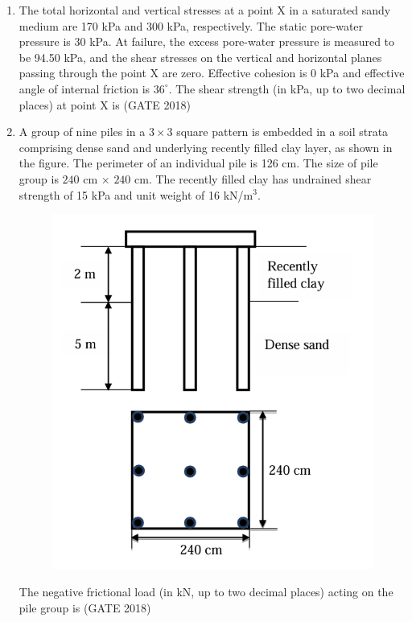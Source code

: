 \documentclass[journal,12pt,onecolumn]{IEEEtran}
\theoremstyle{remark}
\begin{document}
\begin{enumerate}
\item The total horizontal and vertical stresses at a point X in a saturated sandy medium are 170 kPa and 300 kPa, respectively. The static pore-water pressure is 30 kPa. At failure, the excess pore-water pressure is measured to be 94.50 kPa, and the shear stresses on the vertical and horizontal planes passing through the point X are zero. Effective cohesion is 0 kPa and effective angle of internal friction is $36^\circ$. The shear strength (in kPa, up to two decimal places) at point X is \underline{\hspace{3cm}}
\hfill{(GATE 2018)}
\vspace{1cm}
\newpage
\item A group of nine piles in a $3\times 3$ square pattern is embedded in a soil strata comprising dense sand and underlying recently filled clay layer, as shown in the figure. The perimeter of an individual pile is 126 cm. The size of pile group is $240$ cm $\times$ $240$ cm. The recently filled clay has undrained shear strength of 15 kPa and unit weight of 16 kN/m$^3$.
\begin{figure}[h]
    \centering
    \includegraphics[width=0.5\linewidth]{GATE-CE-2018/45-2.png}
    \caption{}
    \label{45-2}
\end{figure}
The negative frictional load (in kN, up to two decimal places) acting on the pile group is \underline{\hspace{3cm}}
\hfill{(GATE 2018)}
\vspace{1cm}


\end{enumerate}
\end{document}

